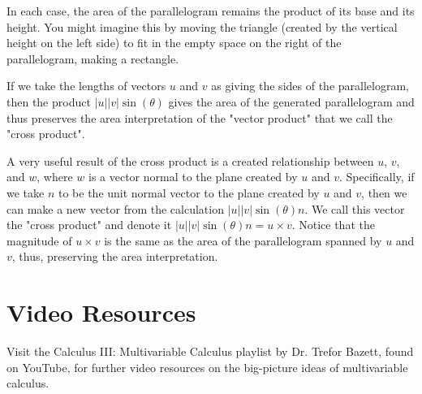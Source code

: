 \documentclass{ximera}
\begin{document}
In each case, the area of the parallelogram remains the product of its base and its height. You might imagine this by moving the triangle (created by the vertical height on the left side) to fit in the empty space on the right of the parallelogram, making a rectangle.

If we take the lengths of vectors $u$ and $v$ as giving the sides of the parallelogram, then the product $|u||v|\sin(\theta)$ gives the area of the generated parallelogram and thus preserves the area interpretation of the "vector product" that we call the "cross product".

A very useful result of the cross product is a created relationship between $u$, $v$, and $w$, where $w$ is a vector normal to the plane created by $u$ and $v$. Specifically, if we take $n$ to be the unit normal vector to the plane created by $u$ and $v$, then we can make a new vector from the calculation $|u||v|\sin(\theta)n$. We call this vector the "cross product" and denote it $|u||v|\sin(\theta)n=u\times v$. Notice that the magnitude of $u\times v$ is the same as the area of the parallelogram spanned by $u$ and $v$, thus, preserving the area interpretation.



\section{Video Resources}


Visit the Calculus III: Multivariable Calculus playlist by Dr. Trefor Bazett, found on YouTube, for further video resources on the big-picture ideas of multivariable calculus.
\end{document}
